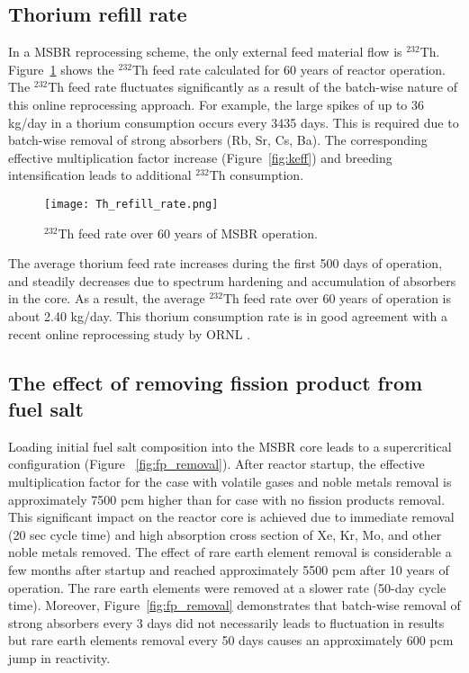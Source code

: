 \subsection{Thorium refill rate}
In a \gls{MSBR} reprocessing scheme, the only external feed material flow  is 
$^{232}$Th. Figure~\ref{fig:th_refill} shows the $^{232}$Th feed rate 
calculated for 60 years of reactor operation. The $^{232}$Th feed rate 
fluctuates significantly as a result of the batch-wise nature of this online 
reprocessing approach. For example, the large spikes of up to 36 kg/day in a 
thorium consumption occurs every 3435 days. This is required due to batch-wise 
removal of strong absorbers (Rb, Sr, Cs, Ba). The corresponding effective 
multiplication factor increase (Figure~\ref{fig:keff}) and breeding 
intensification leads to additional $^{232}$Th consumption.  
\begin{figure}[ht!] %
  \texttt{[image: Th\_refill\_rate.png]} \caption{$^{232}$Th 
  feed rate over 60 years of \gls{MSBR} operation.}
  \label{fig:th_refill}
\end{figure}

The average thorium feed rate increases during the first 500 days of operation, 
and steadily decreases due to spectrum hardening and accumulation of 
absorbers in the core. As a result, the average $^{232}$Th feed rate over 60 
years of operation is about 2.40 kg/day. This thorium consumption rate is in 
good agreement with a recent online reprocessing study by \gls{ORNL} 
\cite{betzler_molten_2017}.

\subsection{The effect of removing fission product from fuel salt}
Loading initial fuel salt composition into the \gls{MSBR} core leads to a 
supercritical configuration (Figure ~\ref{fig:fp_removal}). After reactor 
startup, the effective multiplication factor for the case with volatile gases 
and noble metals removal is approximately 7500 pcm  higher than for case with 
no fission products removal. This significant impact on the reactor core is
achieved due to immediate removal (20 sec cycle time) and high absorption cross 
section of Xe, Kr, Mo, and other noble metals removed. The effect of rare earth 
element removal is considerable a few months after startup and reached 
approximately 5500 pcm after 10 years of operation. The rare earth elements were 
removed at a slower rate (50-day cycle time). Moreover, 
Figure~\ref{fig:fp_removal} demonstrates that batch-wise removal of strong 
absorbers every 3 days did not necessarily leads to fluctuation in results 
but rare earth elements removal every 50 days causes an approximately 600 pcm jump 
in reactivity.

